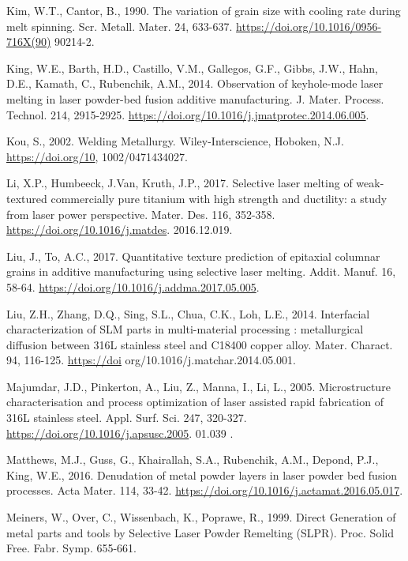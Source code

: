 \documentclass[10pt]{article}
\begin{document}
Kim, W.T., Cantor, B., 1990. The variation of grain size with cooling rate during melt spinning. Scr. Metall. Mater. 24, 633-637. \href{https://doi.org/10.1016/0956-716X(90)}{https://doi.org/10.1016/0956-716X(90)} 90214-2.

King, W.E., Barth, H.D., Castillo, V.M., Gallegos, G.F., Gibbs, J.W., Hahn, D.E., Kamath, C., Rubenchik, A.M., 2014. Observation of keyhole-mode laser melting in laser powder-bed fusion additive manufacturing. J. Mater. Process. Technol. 214, 2915-2925. \href{https://doi.org/10.1016/j.jmatprotec.2014.06.005}{https://doi.org/10.1016/j.jmatprotec.2014.06.005}.

Kou, S., 2002. Welding Metallurgy. Wiley-Interscience, Hoboken, N.J. \href{https://doi.org/10}{https://doi.org/10}, 1002/0471434027.

Li, X.P., Humbeeck, J.Van, Kruth, J.P., 2017. Selective laser melting of weak-textured commercially pure titanium with high strength and ductility: a study from laser power perspective. Mater. Des. 116, 352-358. \href{https://doi.org/10.1016/j.matdes}{https://doi.org/10.1016/j.matdes}. 2016.12.019.

Liu, J., To, A.C., 2017. Quantitative texture prediction of epitaxial columnar grains in additive manufacturing using selective laser melting. Addit. Manuf. 16, 58-64. \href{https://doi.org/10.1016/j.addma.2017.05.005}{https://doi.org/10.1016/j.addma.2017.05.005}.

Liu, Z.H., Zhang, D.Q., Sing, S.L., Chua, C.K., Loh, L.E., 2014. Interfacial characterization of SLM parts in multi-material processing : metallurgical diffusion between 316L stainless steel and C18400 copper alloy. Mater. Charact. 94, 116-125. \href{https://doi}{https://doi} org/10.1016/j.matchar.2014.05.001.

Majumdar, J.D., Pinkerton, A., Liu, Z., Manna, I., Li, L., 2005. Microstructure characterisation and process optimization of laser assisted rapid fabrication of 316L stainless steel. Appl. Surf. Sci. 247, 320-327. \href{https://doi.org/10.1016/j.apsusc.2005}{https://doi.org/10.1016/j.apsusc.2005}. 01.039 .

Matthews, M.J., Guss, G., Khairallah, S.A., Rubenchik, A.M., Depond, P.J., King, W.E., 2016. Denudation of metal powder layers in laser powder bed fusion processes. Acta Mater. 114, 33-42. \href{https://doi.org/10.1016/j.actamat.2016.05.017}{https://doi.org/10.1016/j.actamat.2016.05.017}.

Meiners, W., Over, C., Wissenbach, K., Poprawe, R., 1999. Direct Generation of metal parts and tools by Selective Laser Powder Remelting (SLPR). Proc. Solid Free. Fabr. Symp. 655-661.
\end{document}
